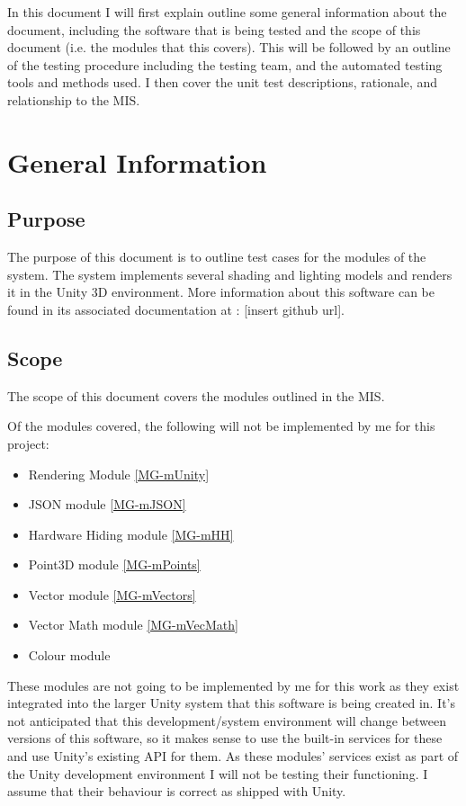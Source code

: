 \documentclass[12pt, titlepage]{article}
\begin{document}
In this document I will first explain outline some general information about 
the document, including the software that is being tested and the scope of this 
document (i.e. the modules that this covers). This will be followed by an 
outline of the testing procedure including the testing team, and the automated 
testing tools and methods used. I then cover the unit test descriptions, 
rationale, and relationship to the MIS.


\section{General Information}

\subsection{Purpose}
The purpose of this document is to outline test cases for the modules of the 
\progname system. The \progname system implements several shading and lighting 
models and renders it in the Unity 3D environment. More information about this 
software can be found in its associated documentation at : [insert github url].

\subsection{Scope}
The scope of this document covers the modules outlined in the MIS. 

Of the modules covered, the following will not be implemented by me for this 
project:

\begin{itemize}
	\item Rendering Module \ref{MG-mUnity}
	\item JSON module \ref{MG-mJSON}
	\item Hardware Hiding module \ref{MG-mHH}
	\item Point3D module \ref{MG-mPoints}
	\item Vector module \ref{MG-mVectors}
	\item Vector Math module \ref{MG-mVecMath}	
	\item Colour module
	
\end{itemize}

These modules are not going to be implemented by me for this work as they exist 
integrated into the larger Unity system that this software is being created in. 
It's not anticipated that this development/system environment will change 
between versions of this software, so it makes sense to use the built-in 
services for these and use Unity's existing API for them. As these modules' 
services exist as part of the Unity development environment I will not be 
testing their functioning. I assume that their behaviour is correct as shipped 
with Unity.
\end{document}
